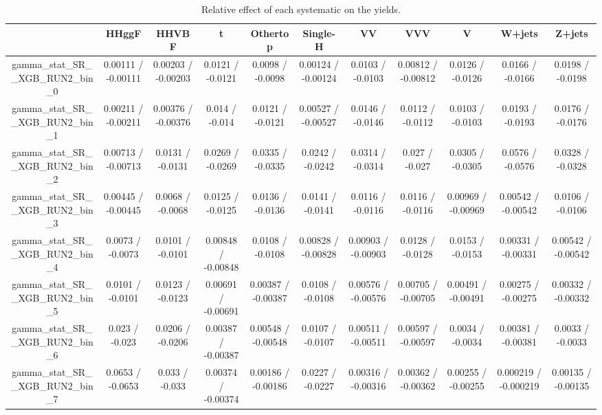 \documentclass[10pt]{article}
\begin{document}
\begin{table}[htbp]
\begin{center}
\begin{tabular}{|c|c|c|c|c|c|c|c|c|c|c|}
\hline 
      & HHggF      & HHVBF      & t      & Othertop      & Single-H      & VV      & VVV      & V      & W+jets      & Z+jets \\ 
\hline 
  gamma_stat_SR__XGB_RUN2_bin_0 & 0.00111 / -0.00111 & 0.00203 / -0.00203 & 0.0121 / -0.0121 & 0.0098 / -0.0098 & 0.00124 / -0.00124 & 0.0103 / -0.0103 & 0.00812 / -0.00812 & 0.0126 / -0.0126 & 0.0166 / -0.0166 & 0.0198 / -0.0198 \\ 
  gamma_stat_SR__XGB_RUN2_bin_1 & 0.00211 / -0.00211 & 0.00376 / -0.00376 & 0.014 / -0.014 & 0.0121 / -0.0121 & 0.00527 / -0.00527 & 0.0146 / -0.0146 & 0.0112 / -0.0112 & 0.0103 / -0.0103 & 0.0193 / -0.0193 & 0.0176 / -0.0176 \\ 
  gamma_stat_SR__XGB_RUN2_bin_2 & 0.00713 / -0.00713 & 0.0131 / -0.0131 & 0.0269 / -0.0269 & 0.0335 / -0.0335 & 0.0242 / -0.0242 & 0.0314 / -0.0314 & 0.027 / -0.027 & 0.0305 / -0.0305 & 0.0576 / -0.0576 & 0.0328 / -0.0328 \\ 
  gamma_stat_SR__XGB_RUN2_bin_3 & 0.00445 / -0.00445 & 0.0068 / -0.0068 & 0.0125 / -0.0125 & 0.0136 / -0.0136 & 0.0141 / -0.0141 & 0.0116 / -0.0116 & 0.0116 / -0.0116 & 0.00969 / -0.00969 & 0.00542 / -0.00542 & 0.0106 / -0.0106 \\ 
  gamma_stat_SR__XGB_RUN2_bin_4 & 0.0073 / -0.0073 & 0.0101 / -0.0101 & 0.00848 / -0.00848 & 0.0108 / -0.0108 & 0.00828 / -0.00828 & 0.00903 / -0.00903 & 0.0128 / -0.0128 & 0.0153 / -0.0153 & 0.00331 / -0.00331 & 0.00542 / -0.00542 \\ 
  gamma_stat_SR__XGB_RUN2_bin_5 & 0.0101 / -0.0101 & 0.0123 / -0.0123 & 0.00691 / -0.00691 & 0.00387 / -0.00387 & 0.0108 / -0.0108 & 0.00576 / -0.00576 & 0.00705 / -0.00705 & 0.00491 / -0.00491 & 0.00275 / -0.00275 & 0.00332 / -0.00332 \\ 
  gamma_stat_SR__XGB_RUN2_bin_6 & 0.023 / -0.023 & 0.0206 / -0.0206 & 0.00387 / -0.00387 & 0.00548 / -0.00548 & 0.0107 / -0.0107 & 0.00511 / -0.00511 & 0.00597 / -0.00597 & 0.0034 / -0.0034 & 0.00381 / -0.00381 & 0.0033 / -0.0033 \\ 
  gamma_stat_SR__XGB_RUN2_bin_7 & 0.0653 / -0.0653 & 0.033 / -0.033 & 0.00374 / -0.00374 & 0.00186 / -0.00186 & 0.0227 / -0.0227 & 0.00316 / -0.00316 & 0.00362 / -0.00362 & 0.00255 / -0.00255 & 0.000219 / -0.000219 & 0.00135 / -0.00135 \\ 
\hline 
\end{tabular} 
\caption{Relative effect of each systematic on the yields.} 
\end{center} 
\end{table} 
\end{document}
